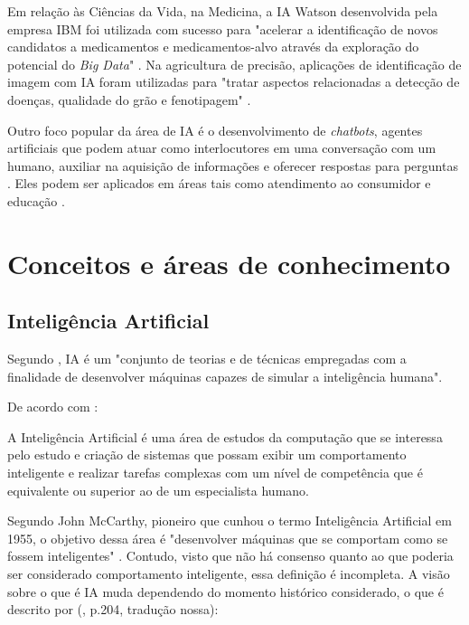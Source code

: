 Em relação às Ciências da Vida, na Medicina, a IA Watson desenvolvida pela empresa IBM foi utilizada com sucesso para "acelerar a identificação de novos candidatos a medicamentos e medicamentos-alvo através da exploração do potencial do \textit{Big Data}" . Na agricultura de precisão, aplicações de identificação de imagem com IA foram utilizadas para "tratar aspectos relacionadas a detecção de doenças, qualidade do grão e fenotipagem" . 

Outro foco popular da área de IA é o desenvolvimento de \textit{chatbots}, agentes artificiais que podem atuar como interlocutores em uma conversação com um humano, auxiliar na aquisição de informações e oferecer respostas para perguntas \cite{wang18}. Eles podem ser aplicados em áreas tais como atendimento ao consumidor \cite{wessel20} e educação \cite{young19}.

\section{Conceitos e áreas de conhecimento} \label{areas-de-con}

\subsection {Inteligência Artificial}
Segundo , IA é um "conjunto de teorias e de técnicas empregadas com a finalidade de desenvolver máquinas capazes de simular a inteligência humana". 

De acordo com :

\begin{citacao}
A Inteligência Artificial é uma área de estudos da computação que se interessa pelo estudo e criação de sistemas que possam exibir um comportamento inteligente e realizar tarefas complexas com um nível de competência que é equivalente ou superior ao de um especialista humano.
\end{citacao}

Segundo John McCarthy, pioneiro que cunhou o termo Inteligência Artificial em 1955, o objetivo dessa área é "desenvolver máquinas que se comportam como se fossem inteligentes" . Contudo, visto que não há consenso quanto ao que poderia ser considerado comportamento inteligente, essa definição é incompleta. A visão sobre o que é IA muda dependendo do momento histórico considerado, o que é descrito por \citeauthor{corduck04} (\citeyear{corduck04}, p.204, tradução nossa):

